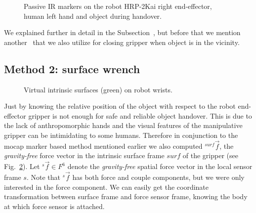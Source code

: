 \begin{figure}[ht]
	\caption{Passive IR markers on the robot HRP-2Kai right end-effector, human left hand and object during handover.}
	\label{fig:markerEf2}
\end{figure} 

We explained further in detail in the Subsection~, but before that we mention another~ that we also utilize for closing gripper when object is in the vicinity.



\subsection{Method 2: surface wrench}\label{surface wrench}

\begin{figure}[ht]
	\caption{Virtual intrinsic surfaces (green) on robot wrists.}
	\label{fig:wrist-surface2}
\end{figure}

Just by knowing the relative position of the object with respect to the robot end-effector gripper is not enough for safe and reliable object handover. This is due to the lack of anthropomorphic hands and the visual features of the manipulative gripper can be intimidating to some humans. Therefore in conjunction to the mocap marker based method mentioned earlier we also computed ${}^{surf}\vec{f}$, the \textit{gravity-free} force vector in the intrinsic surface frame $surf$ of the gripper (see Fig.~\ref{fig:wrist-surface2}). Let ${}^s\vec{f}\in F^6$ denote the \textit{gravity-free} spatial force vector in the local sensor frame $s$. Note that ${}^s\vec{f}$ has both force and couple components, but we were only interested in the force component. We can easily get the coordinate transformation between surface frame and force sensor frame, knowing the body at which force sensor is attached.

